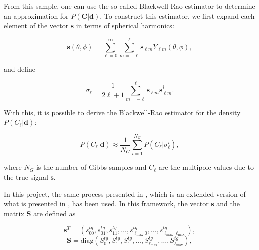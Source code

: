 \documentclass[openany,a4paper,12pt,oneside]{book}
\begin{document}
\begin{spacing}{1.5}
From this sample, one can use the so called Blackwell-Rao estimator to determine an approximation for $P(\mathbf{C}|\mathbf{d})$\cite{Chu_2005}. To construct this estimator, we first expand each element of the vector $\mathbf{s}$ in terms of spherical harmonics:


\begin{equation}\label{s_harmonics}
	\mathbf{s}(\theta, \phi)=\sum_{\ell=0}^\infty \sum_{m=-\ell}^\ell \mathbf{s}_{\ell m}Y_{\ell m}(\theta, \phi),
\end{equation}

\noindent and define

\begin{equation}\label{sigma_l}
	\sigma_\ell=\frac{1}{2\ell+1}\sum_{m=-\ell}^\ell \mathbf{s}_{\ell m}\mathbf{s}_{\ell m}^{\dagger}.
\end{equation}




With this, it is possible to derive the Blackwell-Rao estimator for the density $P(C_\ell|\mathbf{d})$:

\begin{equation}\label{BR_estimator}
	P(C_\ell|\mathbf{d})\approx \frac{1}{N_G}\sum_{i=1}^{N_G}P(C_\ell|\sigma_\ell^i),
\end{equation}

\noindent where $N_G$ is the number of Gibbs samples and $C_\ell$ are the multipole values due to the true signal $\mathbf{s}$.

In this project, the same process presented in \cite{Moura-Santos_2016}, which is an extended version of what is presented in \cite{Larson_2007}, has been used. In this framework, the vector $\mathbf{s}$ and the matrix $\mathbf{S}$ are defined as

\begin{equation}\label{vec_s}
	\mathbf{s}^T=(s_{00}^{tg}, s_{01}^{tg}, s_{11}^{tg}, \dots, s_{\ell_\text{max}0}^{tg}, \dots, s_{\ell_\text{max} \ell_\text{max}}^{tg}),
\end{equation}
\begin{equation}\label{matrix_S}
	\mathbf{S}=\text{diag}(S_0^{tg}, S_1^{tg}, S_1^{tg},\dots, S_{\ell_\text{max}}^{tg}, \dots, S_{\ell_\text{max}}^{tg}),
\end{equation}


\end{spacing}
\end{document}
